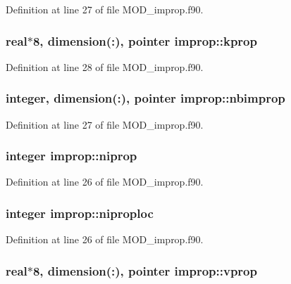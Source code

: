 Definition at line 27 of file M\-O\-D\-\_\-improp.\-f90.

\hypertarget{classimprop_a0181469b731b00c3cba35d2231e410d1}{
\subsubsection[{kprop}]{\setlength{\rightskip}{0pt plus 5cm}real$\ast$8, dimension(\-:), pointer improp\-::kprop}}\label{classimprop_a0181469b731b00c3cba35d2231e410d1}


Definition at line 28 of file M\-O\-D\-\_\-improp.\-f90.

\hypertarget{classimprop_a6d51b179690408640548aa63aa67c1eb}{
\subsubsection[{nbimprop}]{\setlength{\rightskip}{0pt plus 5cm}integer, dimension(\-:), pointer improp\-::nbimprop}}\label{classimprop_a6d51b179690408640548aa63aa67c1eb}


Definition at line 27 of file M\-O\-D\-\_\-improp.\-f90.

\hypertarget{classimprop_ad971cf9ff05f047d4499245e5fb050e5}{
\subsubsection[{niprop}]{\setlength{\rightskip}{0pt plus 5cm}integer improp\-::niprop}}\label{classimprop_ad971cf9ff05f047d4499245e5fb050e5}


Definition at line 26 of file M\-O\-D\-\_\-improp.\-f90.

\hypertarget{classimprop_a35013e9b32a8f1d00648077dd425cef5}{
\subsubsection[{niproploc}]{\setlength{\rightskip}{0pt plus 5cm}integer improp\-::niproploc}}\label{classimprop_a35013e9b32a8f1d00648077dd425cef5}


Definition at line 26 of file M\-O\-D\-\_\-improp.\-f90.

\hypertarget{classimprop_a6963ad43d496c261b9ab603a0d029134}{
\subsubsection[{vprop}]{\setlength{\rightskip}{0pt plus 5cm}real$\ast$8, dimension(\-:), pointer improp\-::vprop}}\label{classimprop_a6963ad43d496c261b9ab603a0d029134}


